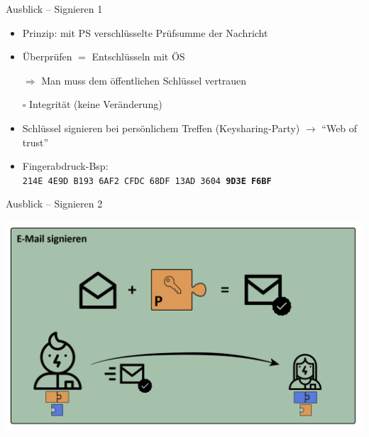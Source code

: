\documentclass{beamer}
\begin{document}
\begin{frame}{Ausblick – Signieren 1}

  \begin{itemize}
   \item Prinzip: mit PS verschlüsselte Prüfsumme der Nachricht
   \item Überprüfen $=$ Entschlüsseln mit ÖS
   \item[$\Rightarrow$] Man muss dem öffentlichen Schlüssel vertrauen\\[2mm]
   \item[$\square$\hspace{-.67em}\raisebox{0.1em}{\scalebox{1.3}{\checkmark}}] Integrität (keine Veränderung)
   \pause

   \item Schlüssel signieren bei persönlichem Treffen (Keysharing-Party) $\rightarrow$ "`Web of trust"'
   \item Fingerabdruck-Bsp:\\
   \texttt{214E 4E9D B193 6AF2 CFDC 68DF 13AD 3604 \textbf{9D3E F6BF}}
  \end{itemize}

\end{frame}


\begin{frame}{Ausblick – Signieren 2}
  \begin{center}
  \includegraphics[width=.9\textwidth]{img-src/pgp_sig.png}
  \end{center}
\end{frame}

\end{document}
